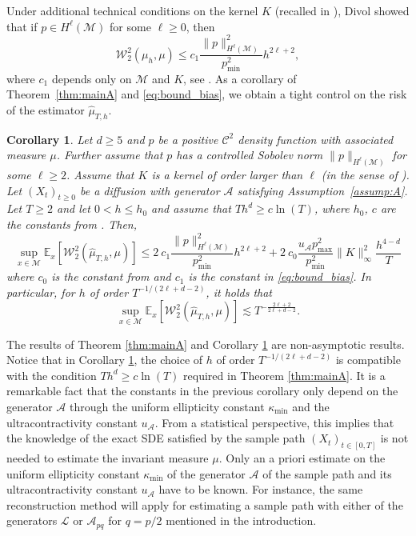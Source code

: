 \documentclass[10pt,a4paper]{article}
\newcommand{\cL}{\mathcal{L}}
\newcommand\cA{\mathcal{A}}
\newcommand\cC{\mathcal{C}}
\newcommand\cM{\mathcal{M}}
\newcommand\W{\mathcal{W}}
\newcommand{\SBRA}[1]{{{\left[#1\right]}}} %
\newtheorem{corollary}[theorem]{Corollary}
\begin{document}
Under additional technical conditions on the kernel $K$ (recalled in ), Divol showed that if $p\in H^\ell(\cM)$ for some $\ell\ge 0$, then
\begin{equation}\label{eq:bound_bias}
    \W_2^2(\mu_h,\mu) \le c_1\frac{\|p\|_{H^\ell(\cM)}^2}{p_{\min}^2} h^{2\ell+2},
\end{equation}
where $c_1$ depends only on $\cM$ and $K$, see  . 
As a corollary of Theorem~\ref{thm:mainA} and \eqref{eq:bound_bias}, we obtain a tight control on the risk of the estimator $\widehat{\mu}_{T,h}$.

\begin{corollary}\label{cor:rate_estimator}
Let $d\ge 5$ and $p$ be a positive $\cC^2$ density function with associated measure $\mu$. Further assume that $p$ has a controlled Sobolev norm $\|p\|_{H^\ell(\cM)}$ for some $\ell\ge 2$.   Assume that $K$ is a kernel of order larger than $\ell$ (in the sense of ). 
Let $(X_t)_{t\ge 0}$ be a diffusion with generator $\cA$ satisfying Assumption~\ref{assump:A}. Let $T\ge 2$ and let $0<h\le h_0$  and assume that $Th^{d}\ge c\ln(T)$, where $h_0$, $c$ are the constants from . Then,
\begin{equation}
   \sup_{x\in \cM} \mathbb{E}_x\SBRA{\W_2^2(\widehat{\mu}_{T,h},\mu)} \le 2 \ c_1\frac{\|p\|_{H^\ell(\cM)}^2}{p_{\min}^2} h^{2\ell+2} +  2\ c_0\frac{ u_\cA p_{\max}^2}{p_{\min}^2} \|K\|_\infty^2 \frac{h^{4-d}}{T}
\end{equation}
where $c_0$ is the constant from  and $c_1$ is the constant in \eqref{eq:bound_bias}. 
In particular, for $h$ of order $T^{-1/(2\ell+d-2)}$, it holds that 
\begin{equation}
    \sup_{x\in \cM} \mathbb{E}_x\SBRA{\W_2^2(\widehat{\mu}_{T,h},\mu)}\lesssim T^{-\frac{2\ell+2}{2\ell+d-2}}.
\end{equation}
\end{corollary}
The results of Theorem \ref{thm:mainA} and Corollary \ref{cor:rate_estimator} are non-asymptotic results. Notice that in Corollary \ref{cor:rate_estimator}, the choice of $h$ of order $T^{-1/(2\ell+d-2)}$ is compatible with the condition $Th^{d}\ge c\ln(T)$ required in Theorem \ref{thm:mainA}. It is a remarkable fact that the constants in the previous corollary only depend on the generator $\cA$ through the uniform ellipticity constant $\kappa_{\min}$ and the ultracontractivity constant $u_\cA$. From a statistical perspective, this implies that the knowledge of the exact SDE satisfied by the sample path $(X_t)_{t\in [0,T]}$ is not needed to estimate the invariant measure $\mu$. Only an a priori estimate on the uniform ellipticity constant $\kappa_{\min}$  of the generator $\cA$ of the sample path and its ultracontractivity constant $u_\cA$ have to be known. For instance, the same reconstruction method will apply for estimating a sample path with either of the generators $\cL$ or $\cA_{pq}$ for $q=p/2$ mentioned in the introduction.
\end{document}
